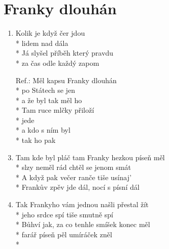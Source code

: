 \section{Franky dlouhán} %
\begin{enumerate}
\item Kolik je  když  čer jdou \\*
lidem nad   dála \\*
Já slyšel příběh který  pravdu  \\*
za čas odle  každý zapom 
\item[Ref.:] Měl kapsu  Franky dlouhán \\*
po Státech  se jen  \\*
a že byl  tak  měl ho  \\*
Tam ruce  mlčky přiloží \\*
 jede  \\*
a  kdo s ním  byl \\*
tak ho  pak  
\item Tam kde byl pláč tam Franky hezkou píseň měl \\*
slzy neměl rád chtěl se jenom smát \\*
A když pak večer ranče tiše usínaj' \\*
Frankův zpěv jde dál, nocí s písní dál 
\item Tak Frankyho vám jednou našli přestal žít \\*
jeho srdce spí tiše smutně spí \\*
Bůhví jak, za co tenhle smíšek konec měl \\*
farář píseň pěl umíráček zněl \\*
\end{enumerate}
